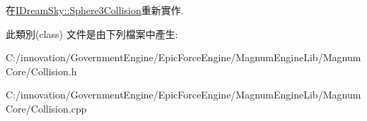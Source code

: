 在\hyperlink{class_i_dream_sky_1_1_sphere3_collision_a401bddbc02cbbe9aeb8ab9b536aba7fb}{I\+Dream\+Sky\+::\+Sphere3\+Collision}重新實作.



此類別(class) 文件是由下列檔案中產生\+:\begin{DoxyCompactItemize}
\item 
C\+:/innovation/\+Government\+Engine/\+Epic\+Force\+Engine/\+Magnum\+Engine\+Lib/\+Magnum\+Core/Collision.\+h\item 
C\+:/innovation/\+Government\+Engine/\+Epic\+Force\+Engine/\+Magnum\+Engine\+Lib/\+Magnum\+Core/Collision.\+cpp\end{DoxyCompactItemize}
